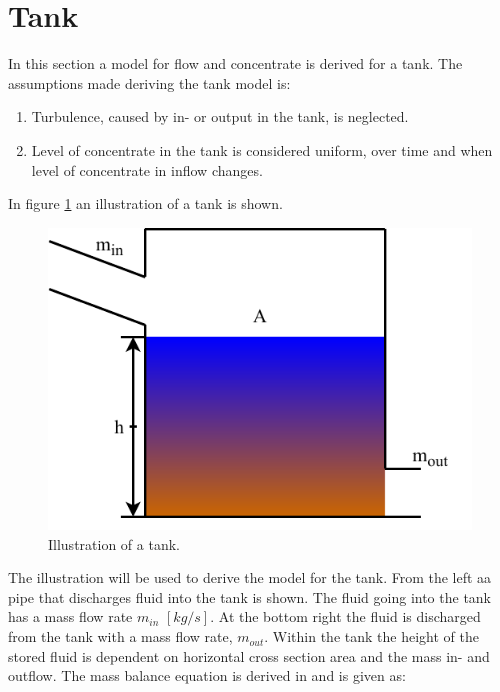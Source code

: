 \section{Tank}\label{se:sewer_reservoir}
In this section a model for flow and concentrate is derived for a tank.%
 The assumptions made deriving the tank model is:
\begin{table}[H]
\begin{enumerate}
\item Turbulence, caused by in- or output in the tank, is neglected.
\item Level of concentrate in the tank is considered uniform, over time and when level of concentrate in inflow changes. 
\end{enumerate}
\end{table}

In figure \ref{fig:tank_model} an illustration of a tank is shown.
\begin{figure}[H]
\centering
\includegraphics[width=.55\textwidth]{report/modeling/pictures/reservior.pdf}
\caption{Illustration of a tank.}
\label{fig:tank_model}
\end{figure} 

The illustration will be used to derive the model for the tank. From the left aa pipe that discharges fluid into the tank is shown. The fluid going into the tank has a mass flow rate $m_{in}$ $\left[kg/s\right]$. At the bottom right the fluid is discharged from the tank with a mass flow rate, $m_{out}$. 
Within the tank the height of the stored fluid is dependent on horizontal cross section area and the mass in- and outflow.
The mass balance equation is derived in \cite{model_tank} and is given as:


